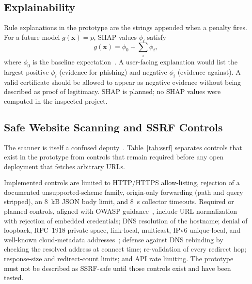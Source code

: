 \documentclass[conference]{IEEEtran}
\begin{document}
\subsection{Explainability}
Rule explanations in the prototype are the strings appended when a penalty fires. For a future model $g(\mathbf{x})=p$, SHAP values $\phi_i$ satisfy
\begin{equation}
g(\mathbf{x})=\phi_0+\sum_i \phi_i,
\label{eq:shap}
\end{equation}
where $\phi_0$ is the baseline expectation~\cite{lundberg2017shap}. A user-facing explanation would list the largest positive $\phi_i$ (evidence for phishing) and negative $\phi_i$ (evidence against). A valid certificate should be allowed to appear as negative evidence without being described as proof of legitimacy. SHAP is planned; no SHAP values were computed in the inspected project.

\subsection{Safe Website Scanning and SSRF Controls}
\label{sec:ssrf}
The scanner is itself a confused deputy~\cite{owaspssrf}. Table~\ref{tab:ssrf} separates controls that exist in the prototype from controls that remain required before any open deployment that fetches arbitrary URLs.

Implemented controls are limited to HTTP/HTTPS allow-listing, rejection of a documented unsupported-scheme family, origin-only forwarding (path and query stripped), an 8~kB JSON body limit, and 8~s collector timeouts. Required or planned controls, aligned with OWASP guidance~\cite{owaspssrf}, include URL normalization with rejection of embedded credentials; DNS resolution of the hostname; denial of loopback, RFC~1918 private space, link-local, multicast, IPv6 unique-local, and well-known cloud-metadata addresses~\cite{rfc1918}; defense against DNS rebinding by checking the resolved address at connect time; re-validation of every redirect hop; response-size and redirect-count limits; and API rate limiting. The prototype must not be described as SSRF-safe until those controls exist and have been tested.
\end{document}
